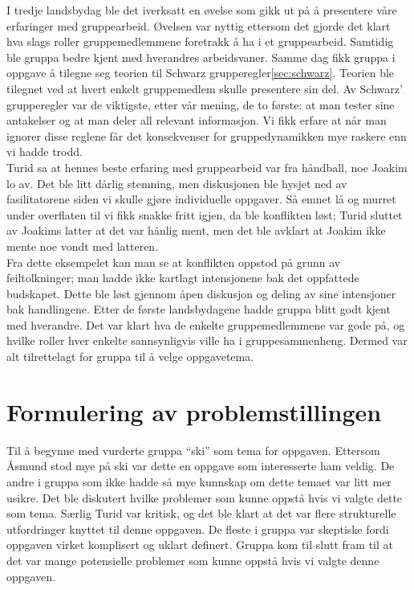 I tredje landsbydag ble det iverksatt en øvelse som gikk ut på å presentere våre
erfaringer med gruppearbeid. Øvelsen var nyttig ettersom det gjorde det klart
hva slags roller gruppemedlemmene foretrakk å ha i et gruppearbeid. Samtidig ble
gruppa bedre kjent med hverandres arbeidsvaner. Samme dag fikk gruppa i oppgave
å tilegne seg teorien til Schwarz grupperegler\cref{sec:schwarz}. Teorien ble
tilegnet ved at hvert enkelt gruppemedlem skulle presentere sin del. Av
Schwarz’ grupperegler var de viktigste, etter vår mening, de to første: at
man tester sine antakelser og at man deler all relevant informasjon.  Vi fikk
erfare at når man ignorer disse reglene får det konsekvenser for
gruppedynamikken mye raskere enn vi hadde trodd. \\

Turid sa at hennes beste erfaring med gruppearbeid var fra håndball, noe Joakim
lo av. Det ble litt dårlig stemning, men diskusjonen ble hysjet ned av
fasilitatorene siden vi skulle gjøre individuelle oppgaver. Så emnet lå og
murret under overflaten til vi fikk snakke fritt igjen, da ble konflikten løst;
Turid sluttet av Joakims latter at det var hånlig ment, men det ble avklart at
Joakim ikke mente noe vondt med latteren.\\

Fra dette eksempelet kan man se at konflikten oppstod på grunn av
feiltolkninger; man hadde ikke kartlagt intensjonene bak det oppfattede
budskapet. Dette ble løst gjennom åpen diskusjon og deling av sine intensjoner
bak handlingene.  Etter de første landsbydagene hadde gruppa blitt godt kjent
med hverandre. Det var klart hva de enkelte gruppemedlemmene var gode på, og
hvilke roller hver enkelte sannsynligvis ville ha i gruppesammenheng. Dermed var
alt tilrettelagt for gruppa til å velge oppgavetema.\\

\section{Formulering av problemstillingen}
Til å begynne med vurderte gruppa ``ski'' som tema for oppgaven. Ettersom Åsmund
stod mye på ski var dette en oppgave som interesserte ham veldig. De andre i
gruppa som ikke hadde så mye kunnskap om dette temaet var litt mer usikre. Det
ble diskutert hvilke problemer som kunne oppstå hvis vi valgte dette
som tema. Særlig Turid var kritisk, og det ble klart at det var flere
strukturelle utfordringer knyttet til denne oppgaven. De fleste i gruppa var
skeptiske fordi oppgaven virket komplisert og uklart definert. Gruppa kom til
slutt fram til at det var mange potensielle problemer som kunne oppstå hvis vi
valgte denne oppgaven.\\


